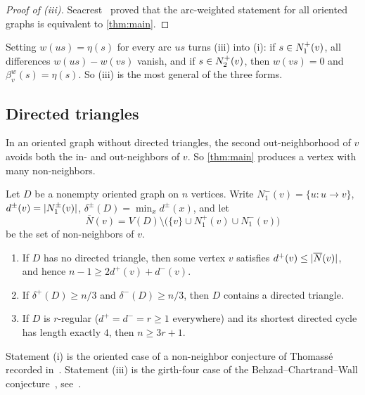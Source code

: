 \begin{proof}[Proof of \textup{(iii)}]
Seacrest~\cite[Proposition~2]{Seacrest2015} proved that the arc-weighted
statement for all oriented graphs is equivalent to \cref{thm:main}.
\end{proof}

Setting $w(us)=\eta(s)$ for every arc $us$ turns (iii) into (i): if $s\in N^+_1(v)$,
all differences $w(us)-w(vs)$ vanish, and if $s\in N^+_2(v)$, then $w(vs)=0$ and
$\beta^w_v(s)=\eta(s)$. So (iii) is the most general of the three forms.

\subsection{Directed triangles}\label{sec:triangles}

In an oriented graph without directed triangles, the second
out-neighborhood of $v$ avoids both the in- and out-neighbors of $v$. So
\cref{thm:main} produces a vertex with many non-neighbors.

\begin{corollary}\label{cor:triangles}
Let $D$ be a nonempty oriented graph on $n$ vertices. Write
$N^-_1(v)=\{u:u\to v\}$, $d^\pm(v)=\lvert N^\pm_1(v)\rvert$, $\delta^\pm(D)=\min_xd^\pm(x)$, and let
\[
 \overline N(v)=V(D)\setminus\bigl(\{v\}\cup N^+_1(v)\cup N^-_1(v)\bigr)
\]
be the set of non-neighbors of $v$.
\begin{enumerate}[label=\textup{(\roman*)}]
\item If $D$ has no directed triangle, then some vertex $v$ satisfies
$d^+(v)\le\lvert \overline N(v)\rvert$, and hence $n-1\ge2d^+(v)+d^-(v)$.
\item If $\delta^+(D)\ge n/3$ and $\delta^-(D)\ge n/3$, then $D$ contains a directed triangle.
\item If $D$ is $r$-regular ($d^+=d^-=r\ge1$ everywhere) and its shortest
directed cycle has length exactly $4$, then $n\ge3r+1$.
\end{enumerate}
\end{corollary}

Statement (i) is the oriented case of a non-neighbor conjecture of
Thomass\'e recorded in~\cite[Conjecture~6.12]{Sullivan2006}. Statement
(iii) is the girth-four case of the Behzad--Chartrand--Wall
conjecture~\cite{BehzadChartrandWall1970}, see~\cite[Section~4]{Sullivan2006}.

